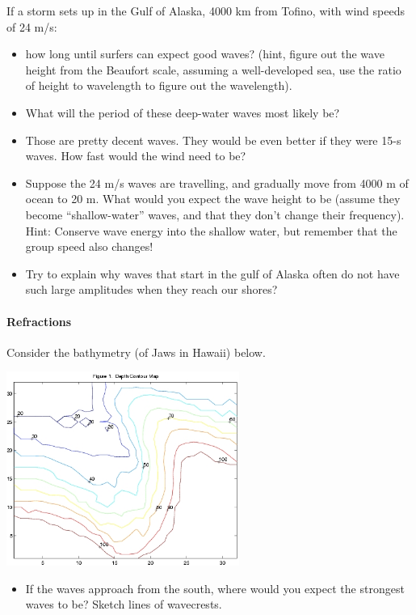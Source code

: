 If a storm sets up in the Gulf of Alaska, 4000 km from Tofino, with wind speeds of 24 m/s:
\begin{itemize}
\item how long until surfers can expect good waves? (hint, figure out the wave height from the Beaufort scale, assuming a well-developed sea, use the ratio of height to wavelength to figure out the wavelength).
    \item What will the period of these deep-water waves most likely be?
    \item Those are pretty decent waves. They would be even better if they were 15-s waves. How fast would the wind need to be? 
    \item Suppose the 24 m/s waves are travelling, and gradually move from 4000 m of ocean to 20 m. What would you expect the wave height to be (assume they become ``shallow-water'' waves, and that they don't change their frequency). Hint: Conserve wave energy into the shallow water, but remember that the group speed also changes!
    \item Try to explain why waves that start in the gulf of Alaska often do not have such large amplitudes when they reach our shores?
\end{itemize}

\paragraph{Refractions}

Consider the bathymetry (of Jaws in Hawaii) below.  

\includegraphics[width=3in]{figs/Waves/JawsDepth}

\begin{itemize}
    \item If the waves approach from the south, where would you expect the strongest waves to be? Sketch lines of wavecrests.
\end{itemize} 

